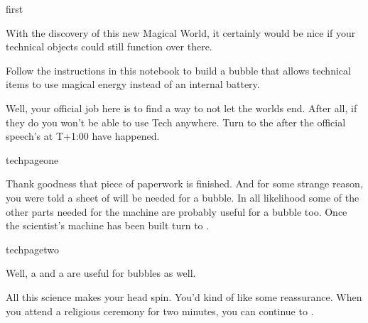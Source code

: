 \documentclass[greennotebook]{guildcamp3} %
\begin{document}
\startnotebook{\nTechBubble{}}



\begin{page}{first}
	
With the discovery of this new Magical World, it certainly would be nice if your technical objects could still function over there.  

Follow the instructions in this notebook to build a bubble that allows technical items to use magical energy instead of an internal battery. 

Well, your official job here is to find a way to not let the worlds end. After all, if they do you won't be able to use Tech anywhere. Turn to the  after the official speech's at T+1:00 have happened.  

\end{page}



\begin{page}{techpageone}

Thank goodness that piece of paperwork is finished. And for some strange reason, you were told a sheet of \iScrapMetal{} will be needed for a bubble. In all likelihood some of the other parts needed for the machine are probably useful for a bubble too. Once the scientist's machine has been built turn to .

\end{page}

\begin{page}{techpagetwo}
	
Well, a \iCircuitBoard{} and a \iCog{} are useful for bubbles as well. 

All this science makes your head spin. You'd kind of like some reassurance. When you attend a religious ceremony for two minutes, you can continue to . 
	
\end{page}
\end{document}
